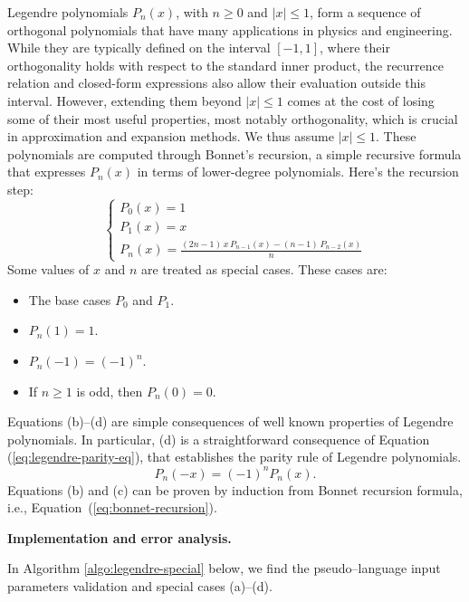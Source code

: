 \documentclass[12pt]{amsart}
\begin{document}
Legendre polynomials $P_n(x)$, with $n \geq 0$ and $\vert x \vert \leq 1$, form
a sequence of orthogonal polynomials that have many applications in physics and
engineering. While they are typically defined on the interval $[-1,1]$,
where their orthogonality holds with respect to the standard inner product,
the recurrence relation and closed-form expressions also allow their
evaluation outside this interval. However, extending them beyond
$\vert x \vert \leq 1$ comes at the cost of losing some of their most
useful properties, most notably orthogonality, which is crucial in
approximation and expansion methods. We thus assume $|x| \le 1$.
These polynomials are computed
through Bonnet's recursion, a simple recursive formula that
expresses $P_n(x)$ in terms of lower-degree polynomials.
Here's the recursion step:
\begin{equation} \label{eq:bonnet-recursion}
  \begin{cases}
      P_0(x) = 1\\
      P_1(x) = x\\
      P_n(x) = \frac{(2n - 1)\, x \, P_{n-1}(x) - (n - 1)\, P_{n-2}(x)}{n}
  \end{cases}
\end{equation}
Some values of $x$ and $n$ are
treated as special cases. These cases are:
\begin{itemize}
\item[(a)] The base cases $P_0$ and $P_1$.
\item[(b)] $P_n(1) = 1$.
\item[(c)] $P_n(-1) = (-1)^n$.
\item[(d)] If $n \ge 1$ is odd, then $P_n(0) = 0$.
\end{itemize}

\noindent Equations (b)--(d) are simple consequences of well known properties of
Legendre polynomials. In particular, (d) is a straightforward consequence of Equation
(\ref{eq:legendre-parity-eq}), that establishes the parity rule of Legendre polynomials.
\begin{equation} \label{eq:legendre-parity-eq}
  P_n(-x) = (-1)^nP_n(x).
\end{equation}
Equations (b) and (c) can be proven by induction from Bonnet recursion formula,
i.e., Equation~(\ref{eq:bonnet-recursion}).

\noindent\textbf{Implementation and error analysis.}

In Algorithm \ref{algo:legendre-special} below, we find the pseudo--language input
parameters validation and special cases (a)--(d).
\vspace{.5cm}
\end{document}

